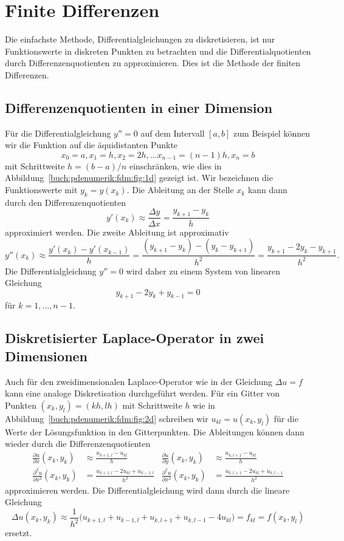 %
%
\section{Finite Differenzen
\label{buch:pdenumerik:section:fdm}}
Die einfachste Methode, Differentialgleichungen zu diskretisieren,
ist nur Funktionswerte in diskreten Punkten zu betrachten und die
Differentialquotienten durch Differenzenquotienten zu approximieren.
Dies ist die Methode der finiten Differenzen.
%
%

%
%
\subsection{Differenzenquotienten in einer Dimension
\label{buch:pdenumerik:fdm:subsection:1d}}
Für die Differentialgleichung $y''=0$ auf dem Intervall $[a,b]$
zum Beispiel können wir die Funktion auf die äquidistanten Punkte
%
\[
x_0=a,
x_1=h,
x_2=2h,
\dots
x_{n-1}=(n-1)h,
x_n=b
\]
mit Schrittweite $h = (b-a)/n$ einschränken, wie dies in
Abbildung~\ref{buch:pdenumerik:fdm:fig:1d} gezeigt ist.
Wir bezeichnen die Funktionswerte mit $y_k = y(x_k)$.
Die Ableitung an der Stelle $x_k$ kann dann durch den Differenzenquotienten
\[
y'(x_k)
\approx
\frac{\Delta y}{\Delta x}
=
\frac{y_{k+1}-y_k}{h}
\]
approximiert werden.
Die zweite Ableitung ist approximativ
\[
y''(x_k)
\approx
\frac{y'(x_k) - y'(x_{k-1})}{h}
=
\frac{(y_{k+1}-y_{k})-(y_k-y_{k+1})}{h^2}
=
\frac{y_{k+1}-2y_{k}-y_{k+1}}{h^2}.
\]
Die Differentialgleichung $y''=0$ wird daher zu einem System von
linearen Gleichung
\[
y_{k+1} - 2y_k + y_{k-1} = 0
\]
für $k=1,\dots,n-1$.

%
%
\subsection{Diskretisierter Laplace-Operator in zwei Dimensionen
\label{buch:pdenumerik:fdm:subsection:laplace}}
Auch für den zweidimensionalen Laplace-Operator wie in der Gleichung
$\Delta u = f$ kann eine analoge Diskretisation durchgeführt
werden.
%
Für ein Gitter von Punkten $(x_k,y_l) = (kh,lh)$ mit Schrittweite $h$
wie in Abbildung~\ref{buch:pdenumerik:fdm:fig:2d}
schreiben wir $u_{kl}=u(x_k,y_l)$ für die Werte der Lösungsfunktion
in den Gitterpunkten.
Die Ableitungen können dann wieder durch die Differenzenquotienten
\begin{align*}
\frac{\partial u}{\partial x}(x_k,y_k)
&\approx
\frac{u_{k+1,l}-u_{kl}}{h}
&
\frac{\partial u}{\partial y}(x_k,y_k)
&\approx
\frac{u_{k,l+1}-u_{kl}}{h}
\\
\frac{\partial^2 u}{\partial x^2}(x_k,y_k)
&=
\frac{u_{k+1,l}-2u_{kl}+u_{k-1,l}}{h^2}
&
\frac{\partial^2 u}{\partial x^2}(x_k,y_k)
&=
\frac{u_{k,l+1}-2u_{kl}+u_{k,l-1}}{h^2}
\end{align*}
approximieren werden.
Die Differentialgleichung wird dann durch die lineare Gleichung
\[
\Delta u(x_k,y_k)
\approx
\frac{1}{h^2}
\bigl(
u_{k+1,l}+u_{k-1,l}+u_{k,l+1}+u_{k,l-1} - 4 u_{kl}
\bigr)
=
f_{kl} = f(x_k,y_l)
\]
ersetzt.

